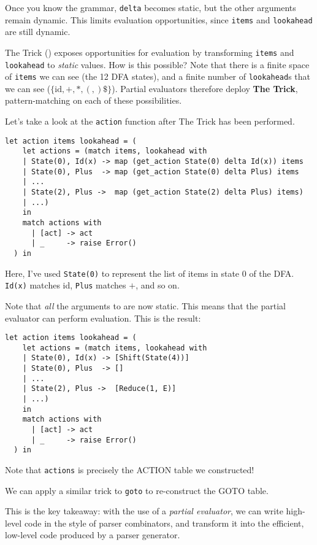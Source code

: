 Once you know the grammar, \texttt{delta} becomes static, but the other arguments remain dynamic. This limits evaluation opportunities, since \texttt{items} and \texttt{lookahead} are still dynamic. 

The Trick () exposes opportunities for evaluation by transforming \texttt{items} and \texttt{lookahead} to \textit{static} values. How is this possible? Note that there is a finite space of \texttt{items} we can see (the 12 DFA states), and a finite number of \texttt{lookahead}s that we can see ($\{\text{id}, +, *, (, ) \$ \}$). Partial evaluators therefore deploy \textbf{The Trick}, pattern-matching on each of these possibilities.

Let's take a look at the \texttt{action} function after The Trick has been performed.
\begin{verbatim}
let action items lookahead = (
    let actions = (match items, lookahead with
    | State(0), Id(x) -> map (get_action State(0) delta Id(x)) items
    | State(0), Plus  -> map (get_action State(0) delta Plus) items
    | ...
    | State(2), Plus ->  map (get_action State(2) delta Plus) items) 
    | ...) 
    in
    match actions with
      | [act] -> act
      | _     -> raise Error()
  ) in
\end{verbatim}
Here, I've used \texttt{State(0)} to represent the list of items in state 0 of the DFA. \texttt{Id(x)} matches id, \texttt{Plus} matches $+$, and so on.

Note that \textit{all} the arguments to  are now static. This means that the partial evaluator can perform evaluation. This is the result:
\begin{verbatim}  
let action items lookahead = (
    let actions = (match items, lookahead with
    | State(0), Id(x) -> [Shift(State(4))]
    | State(0), Plus  -> []
    | ...
    | State(2), Plus ->  [Reduce(1, E)]
    | ...) 
    in
    match actions with
      | [act] -> act
      | _     -> raise Error()
  ) in
\end{verbatim}
Note that \texttt{actions} is precisely the ACTION table we constructed! 

We can apply a similar trick to \texttt{goto} to re-construct the GOTO table.

This is the key takeaway: with the use of a \textit{partial evaluator}, we can write high-level code in the style of parser combinators, and transform it into the efficient, low-level code produced by a parser generator.

